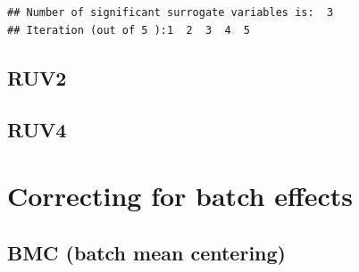 \documentclass[]{book}
\newenvironment{Shaded}{\begin{snugshade}}{\end{snugshade}}
\newcommand{\KeywordTok}[1]{\textcolor[rgb]{0.13,0.29,0.53}{\textbf{#1}}}
\newcommand{\DataTypeTok}[1]{\textcolor[rgb]{0.13,0.29,0.53}{#1}}
\newcommand{\StringTok}[1]{\textcolor[rgb]{0.31,0.60,0.02}{#1}}
\newcommand{\OperatorTok}[1]{\textcolor[rgb]{0.81,0.36,0.00}{\textbf{#1}}}
\newcommand{\NormalTok}[1]{#1}
\begin{document}
\begin{verbatim}
## Number of significant surrogate variables is:  3 
## Iteration (out of 5 ):1  2  3  4  5
\end{verbatim}

\begin{Shaded}
\end{Shaded}

\subsection{RUV2}\label{ruv2}

\subsection{RUV4}\label{ruv4}

\section{Correcting for batch
effects}\label{correcting-for-batch-effects}

\subsection{BMC (batch mean centering)}\label{bmc-batch-mean-centering}
\end{document}
